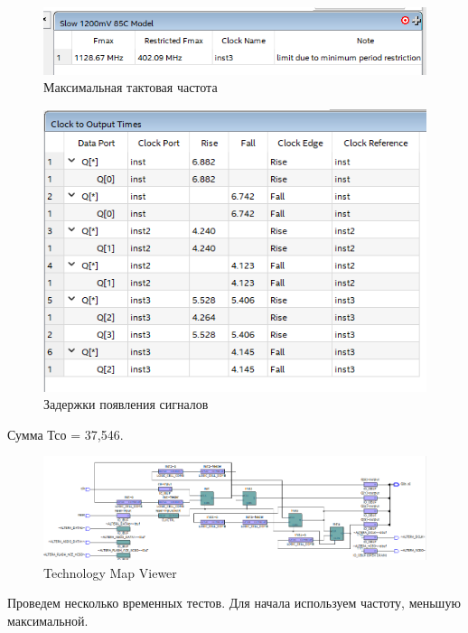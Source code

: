 \documentclass[a4paper,12pt]{article}
\begin{document}
    \begin{figure}[H]
        \centering
        \includegraphics[width=0.6\linewidth]{fmax1}
        \caption{Максимальная тактовая частота}
    \end{figure}

    \begin{figure}[H]
        \centering
        \includegraphics[width=0.7\linewidth]{timings1}
        \caption{Задержки появления сигналов}
    \end{figure}
    Сумма Тсо = 37,546.
    \begin{figure}[H]
        \centering
        \includegraphics[width=0.9\linewidth]{tmv1}
        \caption{Technology Map Viewer}
    \end{figure}

    Проведем несколько временных тестов. Для начала используем частоту, меньшую максимальной.
\end{document}
